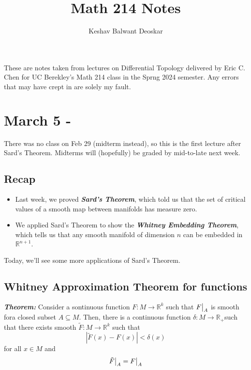 \documentclass{article}
\title{Math 214 Notes}
\author{Keshav Balwant Deoskar}
\newcommand{\R}{\mathbb{R}}
\newcommand{\restr}[2]{{%
  \left.\kern-\nulldelimiterspace %
  #1 %
  \vphantom{\big|} %
  \right|_{#2} %
  }}
\begin{document}
\maketitle

These are notes taken from lectures on Differential Topology delivered by Eric C. Chen for UC Berekley's Math 214 class in the Sprng 2024 semester. Any errors that may have crept in are solely my fault.

\tableofcontents

\pagebreak

\section{March 5 - }
There was no class on Feb 29 (midterm instead), so this is the first lecture after Sard's Theorem. Midterms will (hopefully) be graded by mid-to-late next week.

\vskip 1cm
\subsection*{Recap}
\begin{itemize}
  \item Last week, we proved \textbf{\emph{Sard's Theorem}}, which told us that the set of critical values of a smooth map between manifolds has measure zero.
  \item We applied Sard's Theorem to show the \emph{\textbf{Whitney Embedding Theorem}}, which tells us that any smooth manifold of dimension $n$ can be embedded in $\R^{n+1}$.
\end{itemize}

Today, we'll see some more applications of Sard's Theorem.

\vskip 0.5cm
\subsection{Whitney Approximation Theorem for functions}

\begin{dottedbox}
  \emph{\textbf{Theorem:}} Consider a sontinuous function $F : M \rightarrow \R^k$ such that $\restr{F}{A}$ is smooth fora closed subset $A \subseteq M$. Then, there is a continuous function $\delta : M \rightarrow \R_+$such that there exists smooth $\tilde{F} : M \rightarrow \R^k$ such that 
  \[ \left| \tilde{F}(x) -F(x) \right| < \delta(x) \]
  for all $x \in M$ and 
  \[ \restr{\tilde{F}}{A} = \restr{F}{A} \]
\end{dottedbox}
\end{document}
